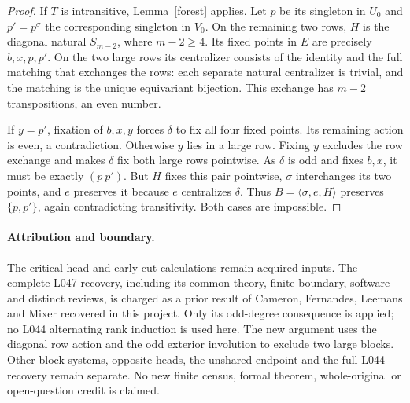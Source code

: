 \documentclass[11pt,a4paper]{article}
\newcommand{\gen}[1]{\langle#1\rangle}
\begin{document}
\begin{proof}
If $T$ is intransitive, Lemma~\ref{forest} applies. Let $p$
be its singleton in $U_0$ and $p'=p^\sigma$ the corresponding
singleton in $V_0$. On the remaining two rows, $H$ is the
diagonal natural $S_{m-2}$, where $m-2\ge4$. Its fixed
points in $E$ are precisely $b,x,p,p'$. On the two large
rows its centralizer consists of the identity and the full
matching that exchanges the rows: each separate natural
centralizer is trivial, and the matching is the unique
equivariant bijection. This exchange has $m-2$ transpositions,
an even number.

If $y=p'$, fixation of $b,x,y$ forces $\delta$ to fix all
four fixed points. Its remaining action is even, a contradiction.
Otherwise $y$ lies in a large row. Fixing $y$ excludes the
row exchange and makes $\delta$ fix both large rows pointwise.
As $\delta$ is odd and fixes $b,x$, it must be exactly
$(p\ p')$. But $H$ fixes this pair pointwise, $\sigma$
interchanges its two points, and $e$ preserves it because
$e$ centralizes $\delta$. Thus $B=\gen{\sigma,e,H}$
preserves $\{p,p'\}$, again contradicting transitivity.
Both cases are impossible.
\end{proof}

\paragraph{Attribution and boundary.}
The critical-head and early-cut calculations remain acquired
inputs. The complete L047 recovery, including its common theory,
finite boundary, software and distinct reviews, is charged as a
prior result of Cameron, Fernandes, Leemans and Mixer recovered
in this project. Only its odd-degree consequence is applied;
no L044 alternating rank induction is used here. The new argument
uses the diagonal row action and the odd exterior involution to
exclude two large blocks. Other block systems, opposite heads,
the unshared endpoint and the full L044 recovery remain separate.
No new finite census, formal theorem, whole-original or open-question
credit is claimed.
\end{document}
